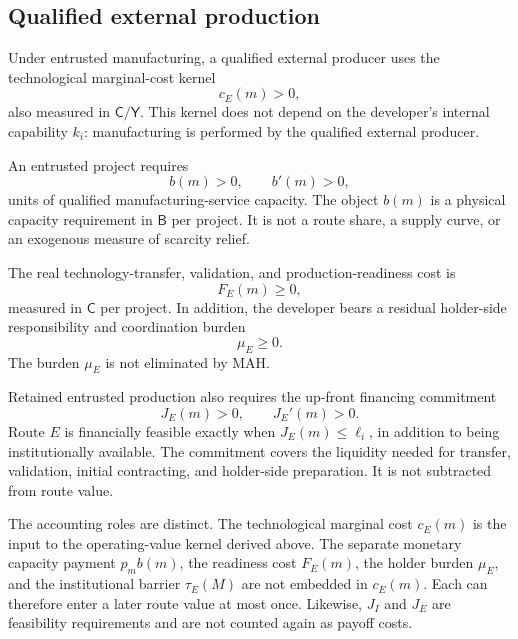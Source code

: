 \subsection{Qualified external production}
\label{subsec:p03-external}

Under entrusted manufacturing, a qualified external producer uses the
technological marginal-cost kernel
\begin{equation}
  c_E(m)>0,
  \label{eq:p03-external-cost}
\end{equation}
also measured in \(\mathsf C/\mathsf Y\). This kernel does not depend on the
developer's internal capability \(k_i\): manufacturing is performed by the
qualified external producer.

An entrusted project requires
\begin{equation}
  b(m)>0,
  \qquad b'(m)>0,
  \label{eq:p03-capacity-requirement}
\end{equation}
units of qualified manufacturing-service capacity. The object \(b(m)\) is a
physical capacity requirement in \(\mathsf B\) per project. It is not a route
share, a supply curve, or an exogenous measure of scarcity relief.

The real technology-transfer, validation, and production-readiness cost is
\begin{equation}
  F_E(m)\geq0,
  \label{eq:p03-external-fixed-cost}
\end{equation}
measured in \(\mathsf C\) per project. In addition, the developer bears a
residual holder-side responsibility and coordination burden
\begin{equation}
  \mu_E\geq0.
  \label{eq:p03-holder-burden}
\end{equation}
The burden \(\mu_E\) is not eliminated by MAH.

Retained entrusted production also requires the up-front financing
commitment
\begin{equation}
  J_E(m)>0,
  \qquad
  J_E'(m)>0.
  \label{eq:p03-external-financing}
\end{equation}
Route \(E\) is financially feasible exactly when \(J_E(m)\leq\ell_i\), in
addition to being institutionally available. The commitment covers the
liquidity needed for transfer, validation, initial contracting, and
holder-side preparation. It is not subtracted from route value.

The accounting roles are distinct. The technological marginal cost \(c_E(m)\)
is the input to the operating-value kernel derived above. The separate
monetary capacity payment \(p_m b(m)\), the readiness cost \(F_E(m)\), the
holder burden \(\mu_E\), and the institutional barrier \(\tau_E(M)\) are not
embedded in \(c_E(m)\). Each can therefore enter a later route value at most
once. Likewise, \(J_I\) and \(J_E\) are feasibility requirements and are not
counted again as payoff costs.

